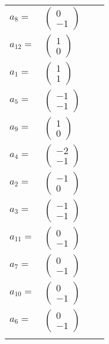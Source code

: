 \documentclass[1p]{elsarticle_modified}
\theoremstyle{definition}
\begin{document}
\begin{tabular}{m{7pt} m{180pt} m{7pt} m{180pt} }
\flushright $a_{8}=$&$\begin{pmatrix}0\\-1\end{pmatrix}$ \\
\flushright $a_{12}=$&$\begin{pmatrix}1\\0\end{pmatrix}$ \\
\flushright $a_{1}=$&$\begin{pmatrix}1\\1\end{pmatrix}$ \\
\flushright $a_{5}=$&$\begin{pmatrix}-1\\-1\end{pmatrix}$ \\
\flushright $a_{9}=$&$\begin{pmatrix}1\\0\end{pmatrix}$ \\
\flushright $a_{4}=$&$\begin{pmatrix}-2\\-1\end{pmatrix}$ \\
\flushright $a_{2}=$&$\begin{pmatrix}-1\\0\end{pmatrix}$ \\
\flushright $a_{3}=$&$\begin{pmatrix}-1\\-1\end{pmatrix}$ \\
\flushright $a_{11}=$&$\begin{pmatrix}0\\-1\end{pmatrix}$ \\
\flushright $a_{7}=$&$\begin{pmatrix}0\\-1\end{pmatrix}$ \\
\flushright $a_{10}=$&$\begin{pmatrix}0\\-1\end{pmatrix}$ \\
\flushright $a_{6}=$&$\begin{pmatrix}0\\-1\end{pmatrix}$\\&\end{tabular}
\end{document}
